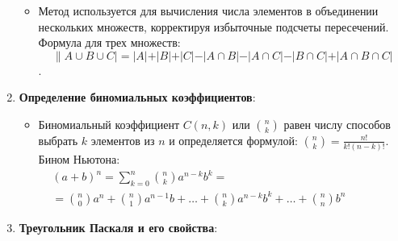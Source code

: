 \documentclass[
]{article}
\providecommand{\tightlist}{%
  \setlength{\itemsep}{0pt}\setlength{\parskip}{0pt}}
\begin{document}
\begin{enumerate}
  \begin{itemize}
  \tightlist
  \item
    Метод используется для вычисления числа элементов в объединении
    нескольких множеств, корректируя избыточные подсчеты пересечений.
    Формула для трех множеств:
    \begin{equation}\|A \cup B \cup C| = |A| + |B| + |C| - |A \cap B| - |A \cap C| - |B \cap C| + |A \cap B \cap C|\end{equation}.
  \end{itemize}
\item
  \textbf{Определение биномиальных коэффициентов}:

  \begin{itemize}
  \tightlist
  \item
    Биномиальный коэффициент \(C(n, k)\) или \(\binom{n}{k}\) равен числу
    способов выбрать \(k\) элементов из \(n\) и определяется
    формулой: \(\binom{n}{k} = \frac{n!}{k!(n-k)!}\).
    Бином Ньютона:
    \begin{math}
      \begin{aligned}
        &(a+b)^{n}=\sum _{k=0}^{n}{\binom {n}{k}}a^{n-k}b^{k}=\\
        &={\binom {n}{0}}a^{n}+{\binom {n}{1}}a^{n-1}b+\dots +{\binom {n}{k}}a^{n-k}b^{k}+\dots +{\binom {n}{n}}b^{n}
      \end{aligned}
    \end{math}
    

  \end{itemize}
\item
  \textbf{Треугольник Паскаля и его свойства}:


\end{enumerate}
\end{document}

